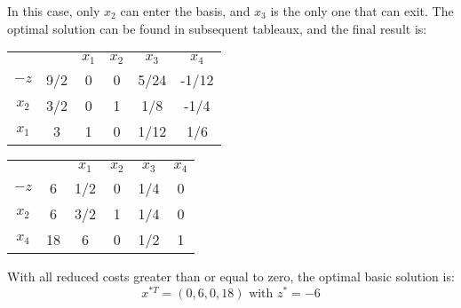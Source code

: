 \begin{example}
\begin{table}[H]
    \end{table}
    In this case, only $x_2$ can enter the basis, and $x_3$ is the only one that can exit.
    The optimal solution can be found in subsequent tableaux, and the final result is:
    \begin{table}[H]
        \centering
        \begin{tabular}{cccccc}
                                   &                            & $x_1$ & $x_2$ & $x_3$ & $x_4$                         \\ \cline{2-6} 
        \multicolumn{1}{c|}{$-z$}  & \multicolumn{1}{c|}{9/2}   & 0     & 0     & 5/24  & \multicolumn{1}{c|}{-1/12}    \\ \cline{2-6} 
        \multicolumn{1}{c|}{$x_2$} & \multicolumn{1}{c|}{3/2}   & 0     & 1     & 1/8   & \multicolumn{1}{c|}{-1/4}     \\
        \multicolumn{1}{c|}{$x_1$} & \multicolumn{1}{c|}{3}     & 1     & 0     & 1/12  & \multicolumn{1}{c|}{1/6}      \\ \cline{2-6} 
        \end{tabular}
    \end{table}
    \begin{table}[H]
        \centering
        \begin{tabular}{cccccc}
                                   &                         & $x_1$ & $x_2$ & $x_3$ & $x_4$                    \\ \cline{2-6} 
        \multicolumn{1}{c|}{$-z$}  & \multicolumn{1}{c|}{6}  & 1/2   & 0     & 1/4   & \multicolumn{1}{c|}{0}   \\ \cline{2-6} 
        \multicolumn{1}{c|}{$x_2$} & \multicolumn{1}{c|}{6}  & 3/2   & 1     & 1/4   & \multicolumn{1}{c|}{0}   \\
        \multicolumn{1}{c|}{$x_4$} & \multicolumn{1}{c|}{18} & 6     & 0     & 1/2   & \multicolumn{1}{c|}{1}   \\ \cline{2-6} 
        \end{tabular}
    \end{table}
    With all reduced costs greater than or equal to zero, the optimal basic solution is: 
    \[x^{\ast T}=(0,6,0,18) \text{ with } z^{\ast}=-6\]
\end{example}

